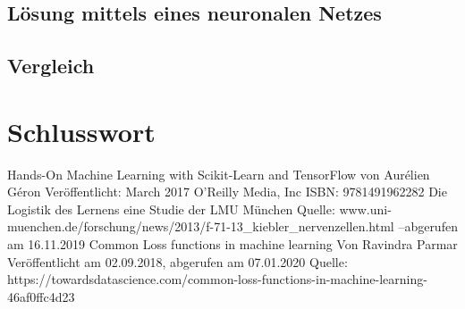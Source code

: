 \documentclass{article}
\begin{document}
\subsection{Lösung mittels eines neuronalen Netzes}
\subsection{Vergleich}
\section{Schlusswort}
\newpage
\begin{thebibliography}{99}
	Hands-On Machine Learning with Scikit-Learn and TensorFlow\newline
	von Aurélien Géron\newline
	Veröffentlicht: March 2017 O'Reilly Media, Inc\newline
	ISBN: 9781491962282
	Die Logistik des Lernens eine Studie der LMU München\newline
	Quelle: www.uni-muenchen.de/forschung/news/2013/\newline f-71-13\_kiebler\_nervenzellen.html --abgerufen am 16.11.2019
	Common Loss functions in machine learning\newline
	Von Ravindra Parmar\newline
	Veröffentlicht am 02.09.2018, abgerufen am 07.01.2020\newline
	Quelle: https://towardsdatascience.com/common-loss-functions-in-machine-learning-46af0ffc4d23 
	
\end{thebibliography}
\listoffigures
\end{document}
